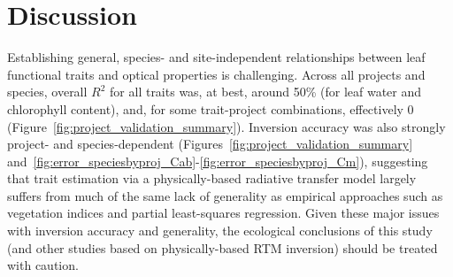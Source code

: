\section{Discussion}

Establishing general, species- and site-independent relationships between leaf functional traits and optical properties is challenging.
Across all projects and species, overall $R^2$ for all traits was, at best, around 50\% (for leaf water and chlorophyll content), and, for some trait-project combinations, effectively 0 (Figure~\ref{fig:project_validation_summary}).
% 
% 
% 
% 
% 
% 
% 
Inversion accuracy was also strongly project- and species-dependent (Figures~\ref{fig:project_validation_summary} and~\ref{fig:error_speciesbyproj_Cab}-\ref{fig:error_speciesbyproj_Cm}), suggesting that trait estimation via a physically-based radiative transfer model largely suffers from much of the same lack of generality as empirical approaches such as vegetation indices and partial least-squares regression.
% 
% 
% 
Given these major issues with inversion accuracy and generality, the ecological conclusions of this study (and other studies based on physically-based RTM inversion) should be treated with caution.
% 
% 
% 

